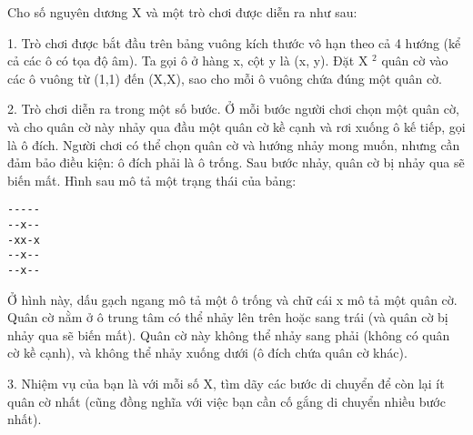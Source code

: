 Cho số nguyên dương X và một trò chơi được diễn ra như sau:   

   1. Trò chơi được bắt đầu trên bảng vuông kích thước vô hạn theo cả 4 hướng (kể cả các ô có tọa độ âm). Ta gọi ô ở hàng x, cột y là (x, y). Đặt X   $^    2   $   quân cờ vào các ô vuông từ (1,1) đến (X,X), sao cho mỗi ô vuông chứa đúng một quân cờ.  

   2. Trò chơi diễn ra trong một số bước. Ở mỗi bước người chơi chọn một quân cờ, và cho quân cờ này nhảy qua đầu một quân cờ kề cạnh và rơi xuống ô kế tiếp, gọi là ô đích. Người chơi có thể chọn quân cờ và hướng nhảy mong muốn, nhưng cần đảm bảo điều kiện: ô đích phải là ô trống. Sau bước nhảy, quân cờ bị nhảy qua sẽ biến mất. Hình sau mô tả một trạng thái của bảng:  
\begin{verbatim}
-----
--x--
-xx-x
--x--
--x--\end{verbatim}

   Ở hình này, dấu gạch ngang mô tả một ô trống và chữ cái x mô tả một quân cờ. Quân cờ nằm ở ô trung tâm có thể nhảy lên trên hoặc sang trái (và quân cờ bị nhảy qua sẽ biến mất). Quân cờ này không thể nhảy sang phải (không có quân cờ kề cạnh), và không thể nhảy xuống dưới (ô đích chứa quân cờ khác).  

   3. Nhiệm vụ của bạn là với mỗi số X, tìm dãy các bước di chuyển để còn lại ít quân cờ nhất (cũng đồng nghĩa với việc bạn cần cố gắng di chuyển nhiều bước nhất).